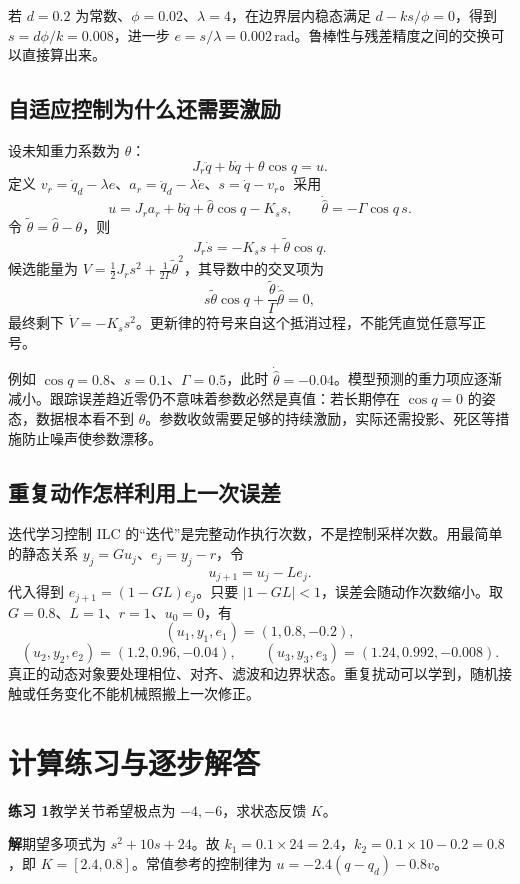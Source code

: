 若 $d=0.2$ 为常数、$\phi=0.02$、$\lambda=4$，在边界层内稳态满足 $d-k s/\phi=0$，得到 $s=d\phi/k=0.008$，进一步 $e=s/\lambda=0.002\,\mathrm{rad}$。鲁棒性与残差精度之间的交换可以直接算出来。

\subsection{自适应控制为什么还需要激励}

设未知重力系数为 $\theta$：
\[
J_r\ddot q+b\dot q+\theta\cos q=u.
\]
定义 $v_r=\dot q_d-\lambda e$、$a_r=\ddot q_d-\lambda\dot e$、$s=\dot q-v_r$。采用
\[
u=J_ra_r+b\dot q+\hat\theta\cos q-K_s s,
\qquad \dot{\hat\theta}=-\Gamma\cos q\,s.
\]
令 $\tilde\theta=\hat\theta-\theta$，则
\[
J_r\dot s=-K_s s+\tilde\theta\cos q.
\]
候选能量为 $V=\tfrac12J_rs^2+\tfrac1{2\Gamma}\tilde\theta^2$，其导数中的交叉项为
\[
s\tilde\theta\cos q+
\frac{\tilde\theta}{\Gamma}\dot{\hat\theta}=0,
\]
最终剩下 $\dot V=-K_ss^2$。更新律的符号来自这个抵消过程，不能凭直觉任意写正号。

例如 $\cos q=0.8$、$s=0.1$、$\Gamma=0.5$，此时 $\dot{\hat\theta}=-0.04$。模型预测的重力项应逐渐减小。跟踪误差趋近零仍不意味着参数必然是真值：若长期停在 $\cos q=0$ 的姿态，数据根本看不到 $\theta$。参数收敛需要足够的持续激励，实际还需投影、死区等措施防止噪声使参数漂移。

\subsection{重复动作怎样利用上一次误差}

迭代学习控制 ILC 的“迭代”是完整动作执行次数，不是控制采样次数。用最简单的静态关系 $y_j=Gu_j$、$e_j=y_j-r$，令
\[
u_{j+1}=u_j-Le_j.
\]
代入得到 $e_{j+1}=(1-GL)e_j$。只要 $|1-GL|<1$，误差会随动作次数缩小。取 $G=0.8$、$L=1$、$r=1$、$u_0=0$，有
\[
(u_1,y_1,e_1)=(1,0.8,-0.2),
\]
\[
(u_2,y_2,e_2)=(1.2,0.96,-0.04),\qquad
(u_3,y_3,e_3)=(1.24,0.992,-0.008).
\]
真正的动态对象要处理相位、对齐、滤波和边界状态。重复扰动可以学到，随机接触或任务变化不能机械照搬上一次修正。

\section{计算练习与逐步解答}

\textbf{练习 1}\quad 教学关节希望极点为 $-4,-6$，求状态反馈 $K$。

\textbf{解}\quad 期望多项式为 $s^2+10s+24$。故 $k_1=0.1\times24=2.4$，$k_2=0.1\times10-0.2=0.8$，即 $K=[2.4,0.8]$。常值参考的控制律为 $u=-2.4(q-q_d)-0.8v$。

